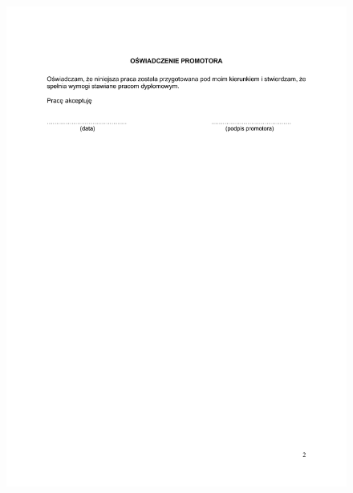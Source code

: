 \documentclass[12pt]{article}
\begin{document}
\begin{figure}[H]
    \centering
	\includegraphics[width=\paperwidth,height=\paperheight,keepaspectratio]{oswiadczenie.pdf}
\end{figure}
\newpage
\end{document}
